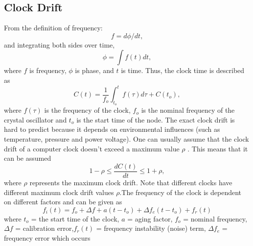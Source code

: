 \documentclass[journal]{IEEEtran}
\begin{document}
\subsection{\textbf{Clock Drift}}
From the definition of frequency:
\begin{equation}
f = d\phi/dt \label{freq_defn} ,
\end{equation}
and integrating both sides over time,
 \begin{equation}
\phi =\int f(t)dt ,
 \end{equation}
where $f$ is frequency, $\phi$ is phase, and $t$ is time.\newline
Thus, the clock time is described as
\begin{equation}
C(t) = \frac{1}{f_o}\int_{t_o}^{t} {f(\tau)d\tau} + C(t_o) ,
\label{clock}
\end{equation}
where $f(\tau)$ is the frequency of the clock, $f_o$ is the nominal
frequency of the crystal oscillator and $t_o$ is the start time of
the node. The exact clock drift is hard to predict because it
depends on environmental influences (such as temperature, pressure
and power voltage). One can usually assume that the clock drift of a
computer clock doesn't exceed a maximum value $\rho$ . This means
that it can be assumed
\begin{equation}
1-\rho \leq \frac{dC(t)}{dt} \leq 1+\rho ,
\end{equation}
where $\rho$ represents the maximum clock drift.
\newline Note that different clocks have different maximum clock drift values
$\rho$.\newline The frequency of the clock is dependent on different
factors and can be given as
\begin{equation}
f_i(t) = f_o + \Delta f + a(t-t_o) + \Delta
f_e(t-t_o) + f_r(t) \label{frequency}
\end{equation}
where \newline $t_o$ = the start time of the clock, \newline $a$ =
aging factor,  \newline $f_o$ = nominal frequency, \newline $\Delta
f$ = calibration error,\newline $f_r(t)$ = frequency instability
(noise) term, \newline $\Delta f_e$ = frequency error which occurs
\end{document}
